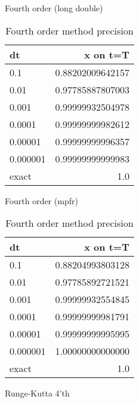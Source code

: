 \documentclass[10pt]{beamer}
\begin{document}
\begin{frame}{Fourth order (long double)}
  \begin{table}
    \caption{Fourth order method precision}
    \begin{tabular}{lr}
      \toprule
      dt & x on t=T\\
      \midrule
      0.1 & 0.88202009642157\\
      0.01 & 0.97785887807003\\
      0.001 & 0.99999932504978\\
      0.0001 & 0.99999999982612\\
      0.00001 & 0.99999999996357\\
      0.000001 & 0.99999999999983\\
      \midrule
      exact & 1.0 \\
      \bottomrule
    \end{tabular}
  \end{table}
\end{frame}

\begin{frame}{Fourth order (mpfr)}
  \begin{table}
    \caption{Fourth order method precision}
    \begin{tabular}{lr}
      \toprule
      dt & x on t=T\\
      \midrule
      0.1 & 0.88204993803128\\
      0.01 & 0.97785892721521\\
      0.001 & 0.99999932554845\\
      0.0001 & 0.99999999981791\\
      0.00001 & 0.99999999995995\\
      0.000001 & 1.00000000000000\\
      \midrule
      exact & 1.0 \\
      \bottomrule
    \end{tabular}
  \end{table}
\end{frame}

\begin{frame}{Runge-Kutta 4'th}
  \begin{figure}
  \end{figure}
\end{frame}
\end{document}
